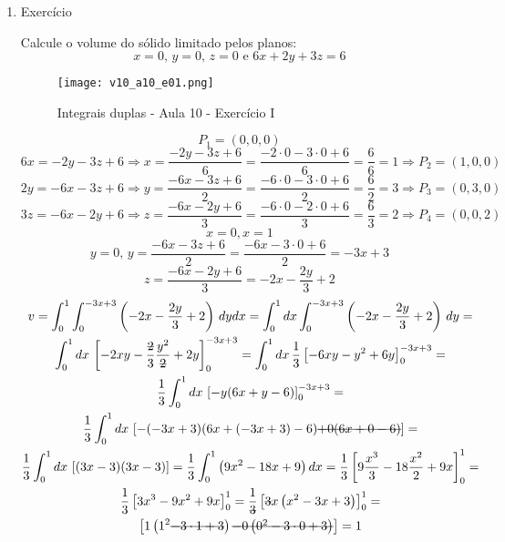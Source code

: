 \begin{enumerate}
	\item Exercício
	
	Calcule o volume do sólido limitado pelos planos:
	\begin{equation*}
		x = 0,\, y = 0,\, z = 0 \textrm{ e } 6x + 2y + 3z = 6
	\end{equation*}
	
	\begin{figure}[htb]
		\caption{Integrais duplas - Aula 10 - Exercício I}
		\label{v10_a10_e01}
		\centering
		\texttt{[image: v10\_a10\_e01.png]}		
	\end{figure}
	
	\begin{equation*}
		P_1 = (0, 0 , 0)	
	\end{equation*}
	\begin{equation*}
		6x = -2y - 3z + 6 \Rightarrow x = \dfrac{-2y - 3z + 6}{6} = \dfrac{-2\cdot0 - 3\cdot0 + 6}{6} = \dfrac{6}{6} = 1 \Rightarrow P_2 = (1,0,0)
	\end{equation*}
	\begin{equation*}
		2y = -6x - 3z + 6 \Rightarrow y = \dfrac{-6x - 3z + 6}{2} = \dfrac{-6\cdot0 - 3\cdot0 + 6}{2} = \dfrac{6}{2} = 3 \Rightarrow P_3 = (0,3,0)
	\end{equation*}
	\begin{equation*}
		3z = -6x - 2y + 6 \Rightarrow z = \dfrac{-6x - 2y + 6}{3} = \dfrac{-6\cdot0 - 2\cdot0 + 6}{3} = \dfrac{6}{3} = 2 \Rightarrow P_4 = (0,0,2)
	\end{equation*}
	\begin{equation*}
		x = 0, x = 1
	\end{equation*}
	\begin{equation*}
		y = 0,\, y = \dfrac{-6x - 3z + 6}{2} = \dfrac{-6x - 3\cdot0 + 6}{2} = -3x + 3
	\end{equation*}
	\begin{equation*}
		z = \dfrac{-6x - 2y + 6}{3} = -2x - \dfrac{2y}{3} + 2
	\end{equation*}
	\begin{gather*}
		v = \int_0^1 \int_0^{-3x + 3} \left(-2x - \dfrac{2y}{3} + 2\right)\, dy dx = \int_0^1 dx \int_0^{-3x + 3} \left(-2x - \dfrac{2y}{3} + 2\right)\, dy =\\ \int_0^1 dx\, \left[-2xy - \dfrac{\overstrike{2}}{3}\dfrac{y^2}{\overstrike{2}} + 2y\right]_0^{-3x + 3} = \int_0^1 dx\, \dfrac{1}{3}\left[-6xy - y^2 + 6y\right]_0^{-3x + 3} =\\ \dfrac{1}{3}\int_0^1 dx\, \left[-y(6x + y - 6)\right]_0^{-3x + 3} =\\ \dfrac{1}{3}\int_0^1 dx\, \left[-(-3x + 3)(6x + (-3x + 3) - 6) \overstrike{+ 0(6x + 0 - 6)}\right] =\\ \dfrac{1}{3}\int_0^1 dx\, \left[(3x-3)(3x - 3)\right] = \dfrac{1}{3}\int_0^1 \left(9x^2 - 18x + 9\right) dx = \dfrac{1}{3}\left[9\dfrac{x^3}{3} - 18 \dfrac{x^2}{2} + 9x\right]_0^1 =\\ \dfrac{1}{3} \left[3x^3 - 9x^2 + 9x\right]_0^1 = \dfrac{1}{\overstrike{3}} \left[\overstrike{3}x\left(x^2 - 3x + 3\right)\right]_0^1 =\\ \left[1\left(1^2 \overstrike{- 3\cdot1 + 3}\right) \overstrike{- 0\left(0^2 - 3\cdot0 + 3\right)}\right] = 1	

\end{gather*}
\end{enumerate}
